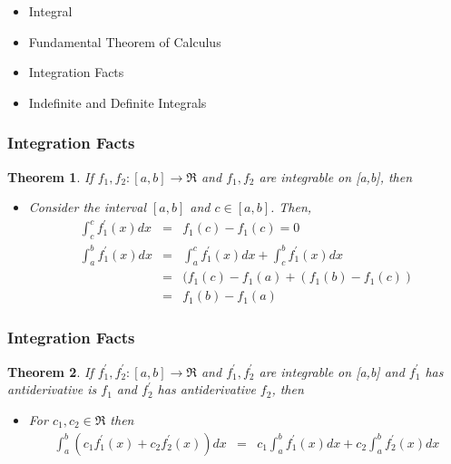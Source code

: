 \documentclass{beamer}
\newtheorem{thm}{Theorem}
\numberwithin{equation}{section}
\begin{document}
\begin{frame}

\begin{itemize}
\item \textcolor{mygray}{Integral}
\item \textcolor{mygray}{Fundamental Theorem of Calculus}
\item \textcolor{myblack}{Integration Facts}
\item \textcolor{mygray}{Indefinite and Definite Integrals}
\end{itemize}

\end{frame}



\begin{frame}
\frametitle{Integration Facts}

\begin{thm} If $f_{1}, f_{2}: [a,b] \rightarrow \Re$ and $f_{1}, f_{2} $ are integrable on [a,b], then
\begin{itemize}
\item[i)] Consider the interval $[a,b]$ and $c \in [a,b]$.  Then, 
\begin{eqnarray}
\int_{c}^{c}f^{'}_{1}(x) dx & = & f_{1}(c) - f_{1}(c) = 0 \nonumber \\
\int_{a}^{b} f^{'}_{1} (x) dx & = & \int_{a}^{c} f^{'}_{1} (x) dx + \int_{c}^{b} f^{'}_{1}(x)dx \nonumber \\
										& = & (f_{1} (c) - f_{1}(a) +  (f_{1}(b) - f_{1}(c) ) \nonumber \\
										& = & f_{1}(b) - f_{1}(a) \nonumber 
\end{eqnarray}										  
\end{itemize}

\end{thm}

\end{frame}



\begin{frame}
\frametitle{Integration Facts}

\begin{thm} If $f_{1}^{'}, f_{2}^{'}: [a,b] \rightarrow \Re$ and $f_{1}^{'}, f_{2}^{'} $ are integrable on [a,b] and $f_1^{'}$ has antiderivative is $f_1$ and $f_2^{'}$ has antiderivative $f_2$, then
\begin{itemize}
\item[ii)] For $c_{1}, c_{2} \in \Re$ then
\begin{eqnarray}
\int_{a}^{b} (c_{1} f_{1}^{'}(x) + c_{2} f_{2}^{'}(x) ) dx & = & c_{1} \int_{a}^{b} f_{1}^{'}(x)dx  + c_{2} \int_{a}^{b}f_{2}^{'}(x) dx \nonumber 
\end{eqnarray}
\end{itemize}
\end{thm}

\end{frame}
\end{document}
